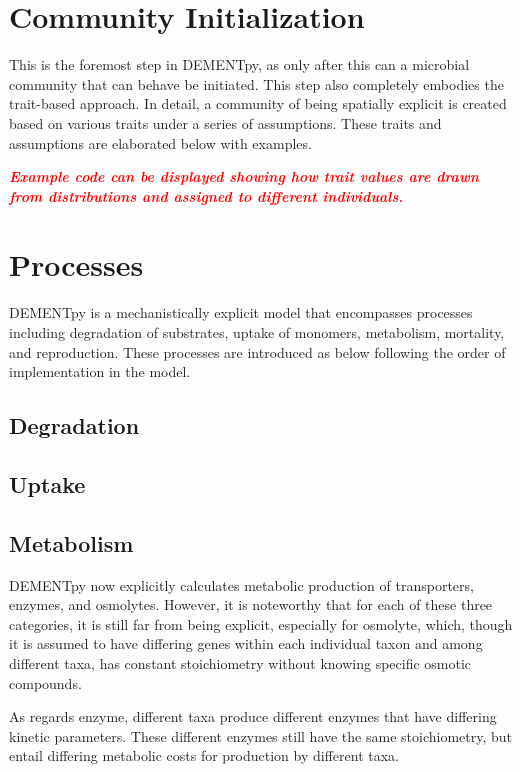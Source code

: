 \documentclass[12pt, oneside, titlepage]{article}   	%
\begin{document}
\section{Community Initialization}
This is the foremost step in DEMENTpy, as only after this can a microbial community that can behave be initiated. This step also completely embodies the trait-based approach. In detail, a community of being spatially explicit is created based on various traits under a series of assumptions. These traits and assumptions are elaborated below with examples.

\textcolor{red}{\textbf{\emph{Example code can be displayed showing how trait values are drawn from distributions and assigned to different individuals.}}}



\section{Processes}
DEMENTpy is a mechanistically explicit model that encompasses processes including degradation of substrates, uptake of monomers, metabolism, mortality, and reproduction. These processes are introduced as below following the order of implementation in the model.
\subsection{Degradation}

\subsection{Uptake}

\subsection{Metabolism}
DEMENTpy now explicitly calculates metabolic production of transporters, enzymes, and osmolytes. However, it is noteworthy that for each of these three categories, it is still far from being explicit, especially for osmolyte, which, though it is assumed to have differing genes within each individual taxon and among different taxa, has constant stoichiometry without knowing specific osmotic compounds.

As regards enzyme, different taxa produce different enzymes that have differing kinetic parameters. These different enzymes still have the same stoichiometry, but entail differing metabolic costs for production by different taxa. 
\end{document}
